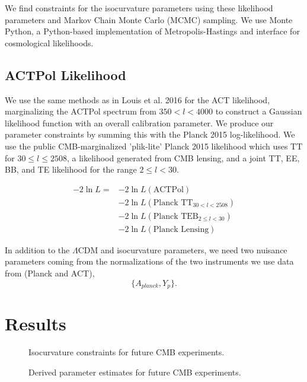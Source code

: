 \documentclass{emulateapj}
\begin{document}
We find constraints for the isocurvature parameters using these likelihood parameters and Markov Chain Monte Carlo (MCMC) sampling. We use Monte Python, a Python-based implementation of Metropolis-Hastings and interface for cosmological likelihoods. 

\subsection{ACTPol Likelihood}

We use the same methods as in Louis et al. 2016 for the ACT likelihood, marginalizing the ACTPol spectrum from $350 < l < 4000$ to construct a Gaussian likelihood function with an overall calibration parameter. We produce our parameter constraints by summing this with the Planck 2015 log-likelihood. We use the public CMB-marginalized 'plik-lite' Planck 2015 likelihood which uses TT for $30 \leq l \leq 2508$, a likelihood generated from CMB lensing, and a joint TT, EE, BB, and TE likelihood for the range $2 \leq l < 30$. 

\begin{align}
-2 \ln L = &- 2 \ln L(\text{ACTPol}) \\
&-2 \ln L(\text{Planck TT}_{30 < l < 2508}) \\ 
&-2 \ln L(\text{Planck TEB}_{2 \leq l < 30})\\ 
&-2 \ln L(\text{Planck Lensing})
\end{align}

In addition to the $\Lambda$CDM and isocurvature parameters, we need two nuisance parameters coming from the normalizations of the two instruments we use data from (Planck and ACT),
\begin{equation}
\{ A_{planck}, Y_p \}.
\end{equation}



\section{Results}


\begin{figure*}
\caption{Isocurvature constraints for future CMB experiments.\label{fig:triangleplots}}
\end{figure*}



\begin{figure*}
\caption{Derived parameter estimates for future CMB experiments.\label{fig:derivedparams}}
\end{figure*}
\end{document}
